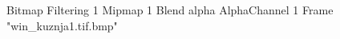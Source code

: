 {Bitmap
	{Filtering 1}
	{Mipmap 1}
	{Blend alpha}
	{AlphaChannel 1}
	{Frame "win_kuznja1.tif.bmp"}
}
